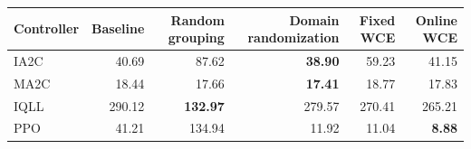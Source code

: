 \begin{tabular}{lrrrrr}
\hline
Controller & Baseline & Random grouping & Domain randomization & Fixed WCE & Online WCE \\
\hline
IA2C & 40.69 & 87.62 & \textbf{38.90} & 59.23 & 41.15 \\
MA2C & 18.44 & 17.66 & \textbf{17.41} & 18.77 & 17.83 \\
IQLL & 290.12 & \textbf{132.97} & 279.57 & 270.41 & 265.21 \\
PPO & 41.21 & 134.94 & 11.92 & 11.04 & \textbf{8.88} \\
\hline
\end{tabular}
